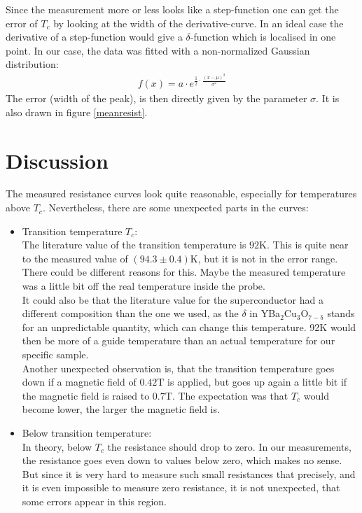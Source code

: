 \documentclass[a4paper,parskip,11pt, DIV12]{scrreprt}
\begin{document}
Since the measurement more or less looks like a step-function one can get the error of $T_{c}$ by looking at the width of the derivative-curve. In an ideal case the derivative of a step-function would give a $\delta$-function which is localised in one point. In our case, the data was fitted with a non-normalized Gaussian distribution:
\begin{align*}
f(x)= a \cdot e^{\frac{1}{2} \cdot \frac{(x-\mu)^2}{\sigma^2}}
\end{align*} 
The error (width of the peak), is then directly given by the parameter $\sigma$. It is also drawn in figure \ref{meanresist}.

\chapter{Discussion}
The measured resistance curves look quite reasonable, especially for temperatures above $T_c$. Nevertheless, there are some unexpected parts in the curves:
\begin{itemize}
\item Transition temperature $T_c$: \\
The literature value of the transition temperature is $92 \mathrm{K}$. This is quite near to the measured value of $(94.3 \pm 0.4) \mathrm{K}$, but it is not in the error range. There could be different reasons for this. Maybe the measured temperature was a little bit off the real temperature inside the probe. \\
It could also be that the literature value for the superconductor had a different composition than the one we used, as the $\delta$ in YBa$_2$Cu$_3$O$_{7-\mathrm{\delta}}$ stands for an unpredictable quantity, which can change this temperature. 92K would then be more of a guide temperature than an actual temperature for our specific sample.\\
Another unexpected observation is, that the transition temperature goes down if a magnetic field of $0.42 \mathrm{T}$ is applied, but goes up again a little bit if the magnetic field is raised to $0.7 \mathrm{T}$. The expectation was that $T_c$ would become lower, the larger the magnetic field is. \\
\item Below transition temperature: \\
In theory, below $T_c$ the resistance should drop to zero. In our measurements, the resistance goes even down to values below zero, which makes no sense. But since it is very hard to measure such small resistances that precisely, and it is even impossible to measure zero resistance, it is not unexpected, that some errors appear in this region. 
\end{itemize}
\end{document}
